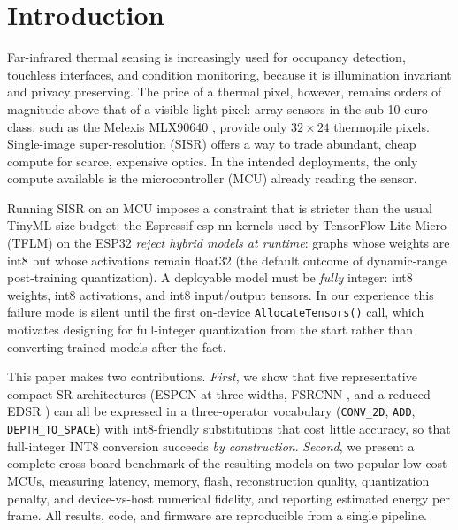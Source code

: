 \documentclass[conference,a4paper]{IEEEtran}
\begin{document}
\section{Introduction}
Far-infrared thermal sensing is increasingly used for occupancy detection,
touchless interfaces, and condition monitoring, because it is illumination
invariant and privacy preserving. The price of a thermal pixel, however,
remains orders of magnitude above that of a visible-light pixel: array
sensors in the sub-10-euro class, such as the Melexis MLX90640
\cite{mlx90640ds}, provide only $32{\times}24$ thermopile pixels. Single-image
super-resolution (SISR) offers a way to trade abundant, cheap compute for
scarce, expensive optics. In the intended deployments, the only compute
available is the microcontroller (MCU) already reading the sensor.

Running SISR on an MCU imposes a constraint that is stricter than the usual
TinyML size budget: the Espressif esp-nn kernels used by TensorFlow Lite
Micro (TFLM) \cite{david2021tflm} on the ESP32 \emph{reject hybrid models at
runtime}: graphs whose weights are int8 but whose activations remain float32
(the default outcome of dynamic-range post-training quantization). A
deployable model must be \emph{fully} integer: int8 weights, int8
activations, and int8 input/output tensors. In our experience this failure
mode is silent until the first on-device \texttt{AllocateTensors()} call,
which motivates designing for full-integer quantization from the start
rather than converting trained models after the fact.

This paper makes two contributions. \emph{First}, we show that five
representative compact SR architectures (ESPCN \cite{shi2016espcn} at three
widths, FSRCNN \cite{dong2016fsrcnn}, and a reduced EDSR \cite{lim2017edsr})
can all be expressed in a three-operator vocabulary (\texttt{CONV\_2D},
\texttt{ADD}, \texttt{DEPTH\_TO\_SPACE}) with int8-friendly substitutions
that cost little accuracy, so that full-integer INT8 conversion succeeds
\emph{by construction}. \emph{Second}, we present a complete cross-board
benchmark of the resulting models on two popular low-cost MCUs, measuring
latency, memory, flash, reconstruction quality, quantization penalty, and
device-vs-host numerical fidelity, and reporting estimated energy per frame.
All results, code, and firmware are reproducible from a single pipeline.
\end{document}
